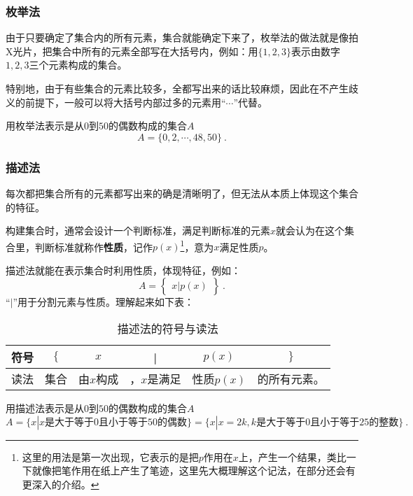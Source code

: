 \subsubsection{枚举法}

由于只要确定了集合内的所有元素，集合就能确定下来了，枚举法的做法就是像拍X光片，把集合中所有的元素全部写在大括号内，例如：用$\{1,2,3\}$表示由数字$1,2,3$三个元素构成的集合。

特别地，由于有些集合的元素比较多，全都写出来的话比较麻烦，因此在不产生歧义的前提下，一般可以将大括号内部过多的元素用“$\cdots$”代替。

\begin{example}{用枚举法表示是从$0$到$50$的偶数构成的集合$A$}
$$A=\{0,2, \cdots ,48,50\}~.$$
\end{example}

\subsubsection{描述法}

每次都把集合所有的元素都写出来的确是清晰明了，但无法从本质上体现这个集合的特征。

构建集合时，通常会设计一个判断标准，满足判断标准的元素$x$就会认为在这个集合里，判断标准就称作\textbf{性质}，记作$p(x)$\footnote{这里的用法是第一次出现，它表示的是把$p$作用在$x$上，产生一个结果，类比一下就像把笔作用在纸上产生了笔迹，这里先大概理解这个记法，在部分还会有更深入的介绍。}，意为$x$满足性质$p$。

描述法就能在表示集合时利用性质，体现特征，例如：
\begin{equation}
A=\begin{Bmatrix} x|p(x) \end{Bmatrix}~.
\end{equation}
“$|$”用于分割元素与性质。理解起来如下表：
\begin{table}[h]
\caption{描述法的符号与读法}\label{tab_HsSet1}
\centering
\begin{tabular}{|c|c|c|c|c|c|}
\hline
符号 & $\{$&$x$ &|& $p(x)$&$\}$ \\
\hline
读法 & 集合&由$x$构成&，$x$是满足& 性质$p(x)$&的所有元素。 \\
\hline
\end{tabular}
\end{table}

\begin{example}{用描述法表示是从$0$到$50$的偶数构成的集合$A$}
$$A=\{x|x\text{是大于等于}0\text{且小于等于}50\text{的偶数}\}=\{x|x=2k,k\text{是大于等于}0\text{且小于等于}25\text{的整数}\}~.$$
\end{example}


